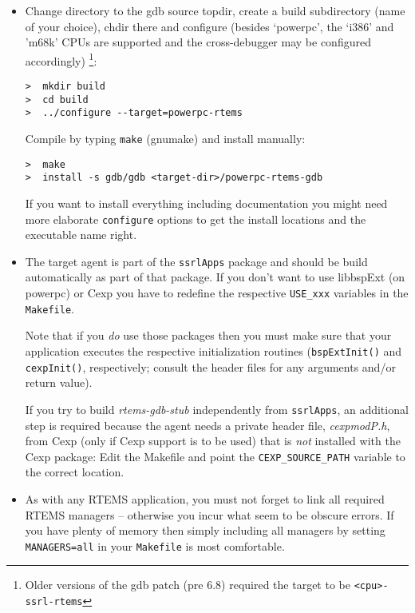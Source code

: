 \documentclass{article}
\begin{document}
\begin{itemize}
\item
  Change directory to the gdb source topdir, create a build
  subdirectory (name of your choice), chdir there and configure
  (besides `powerpc', the `i386' and 'm68k' CPUs are supported and the
  cross-debugger may be configured accordingly)%
\footnote{Older versions of the gdb patch (pre 6.8) required the target
to be {\tt <cpu>-ssrl-rtems}}:
\begin{verbatim}
>  mkdir build
>  cd build
>  ../configure --target=powerpc-rtems  
\end{verbatim}

  Compile by typing {\tt make} (gnumake) and install manually:
\begin{verbatim}
>  make
>  install -s gdb/gdb <target-dir>/powerpc-rtems-gdb
\end{verbatim}

  If you want to install everything including documentation you
  might need more elaborate {\tt configure} options to get the
  install locations and the executable name right.
  
\item
  The target agent is part of the {\tt ssrlApps} package and
  should be build automatically as part of that package.
  If you don't want to use libbspExt (on powerpc) or Cexp
  you have to redefine the respective {\tt USE\_xxx} variables
  in the {\tt Makefile}.

  Note that if you {\em do\/} use those packages then you must
  make sure that your application executes the respective initialization
  routines ({\tt bspExtInit()} and {\tt cexpInit()}, respectively;
  consult the header files for any arguments and/or return value).

  If you try to build {\em rtems-gdb-stub} independently from
  {\tt ssrlApps}, an additional step is required because
  the agent needs a private header file, {\em cexpmodP.h},
  from Cexp (only if Cexp support is to be used) that is {\em not}
  installed with the Cexp package: Edit the Makefile
  and point the {\tt CEXP\_SOURCE\_PATH} variable to the
  correct location.

\item
  As with any RTEMS application, you must not forget to link all
  required RTEMS managers -- otherwise you incur what seem to be
  obscure errors. If you have plenty of memory then simply including
  all managers by setting
  {\tt MANAGERS=all} in your {\tt Makefile} is most comfortable.
  
\end{itemize}
\end{document}

